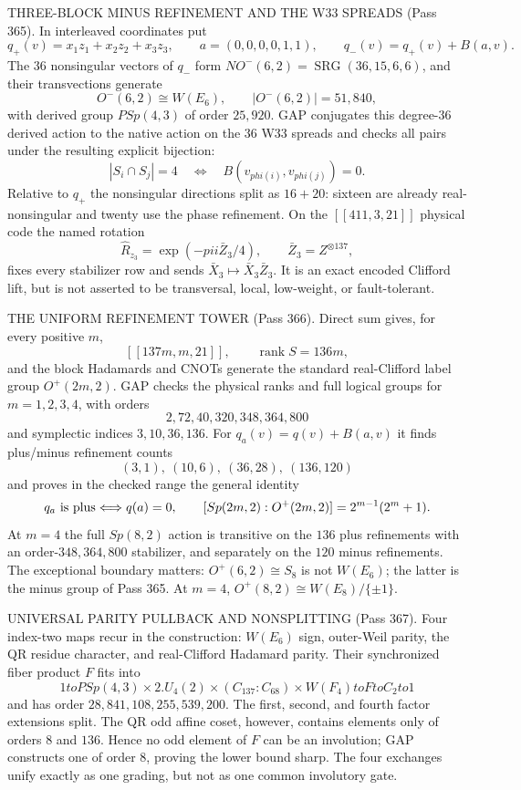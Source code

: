 \documentclass[12pt,a4paper]{article}
\def\textbf#1{#1}%
\def\phi{phi}%
\def\pi{pi}%
\def\to{ to }%
\theoremstyle{definition}
\begin{document}
\begin{center}
{{\smallskip
\textbf{THREE-BLOCK MINUS REFINEMENT AND THE W33 SPREADS (Pass 365).}
In interleaved coordinates put
\[
 q_+(v)=x_1z_1+x_2z_2+x_3z_3,\qquad
 a=(0,0,0,0,1,1),\qquad
 q_-(v)=q_+(v)+B(a,v).
\]
The $36$ nonsingular vectors of $q_-$ form
$NO^-(6,2)=\operatorname{SRG}(36,15,6,6)$, and their transvections generate
\[
 O^-(6,2)\cong W(E_6),\qquad |O^-(6,2)|=51{,}840,
\]
with derived group $PSp(4,3)$ of order $25{,}920$.  GAP conjugates this
degree-$36$ derived action to the native action on the $36$ W33 spreads and
checks all pairs under the resulting explicit bijection:
\[
 |S_i\cap S_j|=4\quad\Longleftrightarrow\quad
 B(v_{\phi(i)},v_{\phi(j)})=0.
\]
Relative to $q_+$ the nonsingular directions split as $16+20$: sixteen are
already real-nonsingular and twenty use the phase refinement.  On the
$[[411,3,21]]$ physical code the named rotation
\[
 \widehat R_{z_3}=\exp(-\pi i\bar Z_3/4),
 \qquad \bar Z_3=Z^{\otimes137},
\]
fixes every stabilizer row and sends
$\bar X_3\mapsto\bar X_3\bar Z_3$.  It is an exact encoded Clifford lift, but
is not asserted to be transversal, local, low-weight, or fault-tolerant.

\smallskip
\textbf{THE UNIFORM REFINEMENT TOWER (Pass 366).}  Direct sum gives, for
every positive $m$,
\[
 [[137m,m,21]],\qquad \operatorname{rank}S=136m,
\]
and the block Hadamards and CNOTs generate the standard real-Clifford label
group $O^+(2m,2)$.  GAP checks the physical ranks and full logical groups for
$m=1,2,3,4$, with orders
\[
 2, 72, 40{,}320, 348{,}364{,}800
\]
and symplectic indices $3,10,36,136$.  For
$q_a(v)=q(v)+B(a,v)$ it finds plus/minus refinement counts
\[
 (3,1),\ (10,6),\ (36,28),\ (136,120)
\]
and proves in the checked range the general identity
\[
 q_a\hbox{ is plus}\Longleftrightarrow q(a)=0,\qquad
 [Sp(2m,2):O^+(2m,2)]=2^{m-1}(2^m+1).
\]
At $m=4$ the full $Sp(8,2)$ action is transitive on the $136$ plus
refinements with an order-$348{,}364{,}800$ stabilizer, and separately on the
$120$ minus refinements.  The exceptional boundary matters:
$O^+(6,2)\cong S_8$ is not $W(E_6)$; the latter is the minus group of Pass
365.  At $m=4$, $O^+(8,2)\cong W(E_8)/\{\pm1\}$.

\smallskip
\textbf{UNIVERSAL PARITY PULLBACK AND NONSPLITTING (Pass 367).}  Four
index-two maps recur in the construction: $W(E_6)$ sign, outer-Weil parity,
the QR residue character, and real-Clifford Hadamard parity.  Their
synchronized fiber product $F$ fits into
\[
 1\to PSp(4,3)\times2.U_4(2)\times(C_{137}:C_{68})\times W(F_4)
 \to F\to C_2\to1
\]
and has order $28{,}841{,}108{,}255{,}539{,}200$.  The first, second, and
fourth factor extensions split.  The QR odd affine coset, however, contains
elements only of orders $8$ and $136$.  Hence no odd element of $F$ can be an
involution; GAP constructs one of order $8$, proving the lower bound sharp.
The four exchanges unify exactly as one grading, but not as one common
involutory gate.

}}
\end{center}
\end{document}
